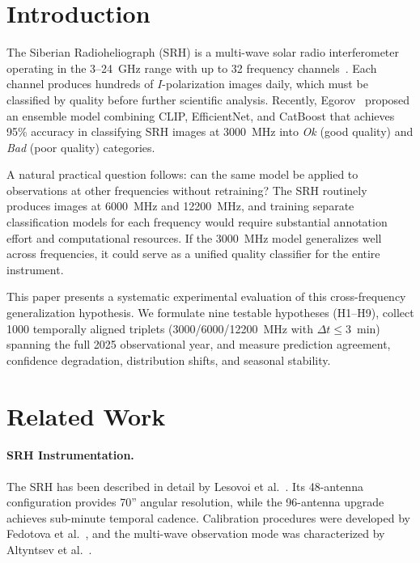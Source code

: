 \documentclass{article}
\theoremstyle{plain}
\theoremstyle{definition}
\begin{document}
\section{Introduction}
\label{sec:intro}

The Siberian Radioheliograph (SRH) is a multi-wave solar radio
interferometer operating in the 3--24~GHz range with up to 32 frequency
channels~\cite{lesovoi2017, altyntsev2020}.  Each channel produces
hundreds of $I$-polarization images daily, which must be classified by
quality before further scientific analysis.  Recently,
Egorov~\cite{egorov2025} proposed an ensemble model combining CLIP,
EfficientNet, and CatBoost that achieves 95\% accuracy in classifying
SRH images at 3000~MHz into \emph{Ok} (good quality) and \emph{Bad}
(poor quality) categories.

A natural practical question follows: can the same model be applied to
observations at other frequencies without retraining?  The SRH routinely
produces images at 6000~MHz and 12200~MHz, and training separate
classification models for each frequency would require substantial
annotation effort and computational resources.  If the 3000~MHz model
generalizes well across frequencies, it could serve as a unified quality
classifier for the entire instrument.

This paper presents a systematic experimental evaluation of this
cross-frequency generalization hypothesis.  We formulate nine testable
hypotheses (H1--H9), collect 1000 temporally aligned triplets
(3000/6000/12200~MHz with $\Delta t \leq 3$~min) spanning the full
2025 observational year, and measure prediction agreement, confidence
degradation, distribution shifts, and seasonal stability.

\section{Related Work}
\label{sec:related}

\paragraph{SRH Instrumentation.} The SRH has been described in detail
by Lesovoi et al.~\cite{lesovoi2014, lesovoi2017}.  Its 48-antenna
configuration provides 70'' angular resolution, while the 96-antenna
upgrade achieves sub-minute temporal cadence.  Calibration procedures
were developed by Fedotova et al.~\cite{fedotova2019}, and the
multi-wave observation mode was characterized by
Altyntsev et al.~\cite{altyntsev2020}.
\end{document}
